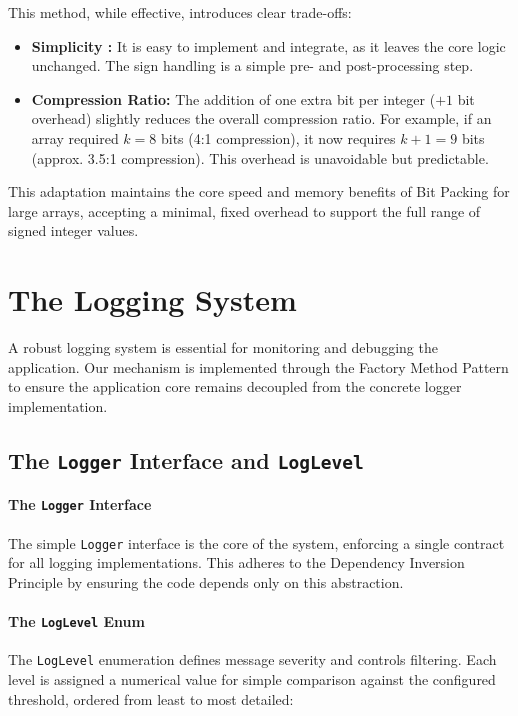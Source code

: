 \documentclass[11pt, a4paper]{article}
\begin{document}
	This method, while effective, introduces clear trade-offs:
	
	\begin{itemize}
		\item \textbf{Simplicity :} It is easy to implement and integrate, as it leaves the  core logic unchanged. The sign handling is a simple pre- and post-processing step.
		
		\item \textbf{Compression Ratio:} The addition of one extra bit per integer ($+1$ bit overhead) slightly reduces the overall compression ratio. For example, if an array required $k=8$ bits (4:1 compression), it now requires $k+1=9$ bits (approx. 3.5:1 compression). This overhead is unavoidable but predictable.
	
	\end{itemize}
	
	This adaptation maintains the core speed and memory benefits of Bit Packing for large arrays, accepting a minimal, fixed overhead to support the full range of signed integer values.
	
	
	\section{The Logging System}
	\label{sec:logging_system}
	
	A robust logging system is essential for monitoring and debugging the application. Our mechanism is implemented through the Factory Method Pattern to ensure the application core remains decoupled from the concrete logger implementation.
	
	\subsection{The \texttt{Logger} Interface and \texttt{LogLevel}}
	
	\paragraph{The \texttt{Logger} Interface}
	The simple \texttt{Logger} interface is the core of the system, enforcing a single contract for all logging implementations. This adheres to the Dependency Inversion Principle by ensuring the code depends only on this abstraction.
	
	
	\paragraph{The \texttt{LogLevel} Enum}
	The \texttt{LogLevel} enumeration defines message severity and controls filtering. Each level is assigned a numerical value for simple comparison against the configured threshold, ordered from least to most detailed:
	
\end{document}
